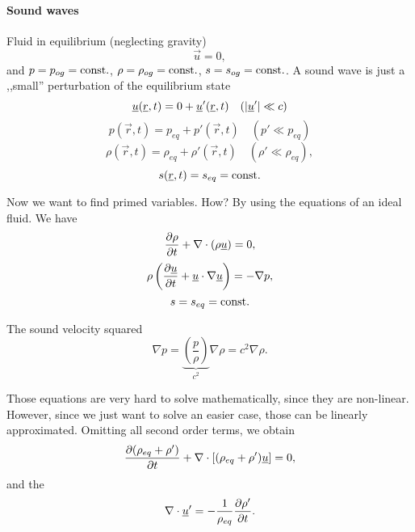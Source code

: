\documentclass[../main.tex]{subfiles}
\begin{document}
    \paragraph{Sound waves}
    Fluid in equilibrium (neglecting gravity)
    \begin{displaymath}
      \vec u = 0,
    \end{displaymath}
    and $p = p_{og} = \textrm{const}.$, $\rho = \rho_{og} = \textrm{const}.$, $s = s_{og} = \textrm{const}.$.
    A sound wave is just a ,,small'' perturbation of the equilibrium state
    \begin{displaymath}
      \underline{u} ( \underline{r}, t) = 0 + \underline{u} ' (\underline{r}, t)  \quad (\left| \underline{u}'\right| \ll c)
    \end{displaymath}
    \begin{displaymath}
      p ( \vec r, t) = p_{eq} + p' (\vec r, t)  \quad (p' \ll p_{eq})
    \end{displaymath}
    \begin{displaymath}
      \rho ( \vec r, t) = \rho_{eq} + \rho' (\vec r, t)  \quad (\rho ' \ll \rho_{eq}),
    \end{displaymath}
    \begin{displaymath}
      s( \underline{r}, t) = s_{eq} = \textrm{const}.
    \end{displaymath}

    Now we want to find primed variables.
    How? By using the equations of an ideal fluid.
    We have
    \begin{equation}
      \frac{\partial \rho}{\partial t} + \nabla \cdot (\rho \underline{u}) = 0,
    \end{equation}
    \begin{equation}
      \rho \left( \frac{\partial \underline{u}}{\partial t} + \underline{u} \cdot \nabla\underline{u} \right) = - \nabla p,
      \label{eq:3.3}
    \end{equation}
    \begin{equation}
      s = s_{eq} = \textrm{const}.
    \end{equation}

    The sound velocity squared
    \begin{displaymath}
      \nabla p = \underbrace{\left( \dfrac{p}{\rho} \right)}_{c^2}\nabla \rho = c^2 \nabla \rho.
    \end{displaymath}
    
    Those equations are very hard to solve mathematically, since they are non-linear.
    However, since we just want to solve an easier case, those can be linearly approximated.
    Omitting all second order terms, we obtain %
    \begin{displaymath}
      \frac{\partial (\rho_{eq} + \rho')}{\partial t} + \nabla \cdot \left[ (\rho_{eq} + \rho') \underline{u} \right] = 0,
    \end{displaymath}
    and the 
    \begin{equation}
      \nabla \cdot \underline{u}' = - \frac{1}{\rho_{eq}} \frac{\partial \rho'}{\partial t}.
      \label{eq:lincont}
    \end{equation}
\end{document}
